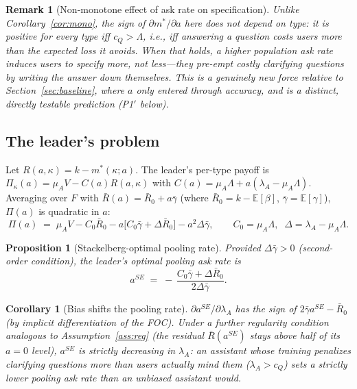 \documentclass[11pt]{article}
\newtheorem{proposition}{Proposition}
\newtheorem{corollary}{Corollary}
\newtheorem{remark}{Remark}
\begin{document}
\begin{remark}[Non-monotone effect of ask rate on specification]
Unlike Corollary~\ref{cor:mono}, the sign of $\partial m^*/\partial a$ here does
not depend on type: it is positive for \emph{every} type iff $c_Q > \Lambda$, i.e.,
iff answering a question costs users more than the expected loss it avoids. When
that holds, a higher population ask rate induces users to specify \emph{more}, not
less---they pre-empt costly clarifying questions by writing the answer down
themselves. This is a genuinely new force relative to Section~\ref{sec:baseline},
where $a$ only entered through accuracy, and is a distinct, directly testable
prediction (P1$'$ below).
\end{remark}

\subsection{The leader's problem}

Let $R(a,\kappa)=k-m^*(\kappa;a)$. The leader's per-type payoff is
$\Pi_\kappa(a) = \mu_A V - C(a)R(a,\kappa)$ with $C(a)=\mu_A\Lambda + a(\lambda_A -
\mu_A\Lambda)$. Averaging over $F$ with $\bar R(a) = \bar R_0 + a\bar\gamma$
(where $\bar R_0=k-\mathbb{E}[\beta]$, $\bar\gamma=\mathbb{E}[\gamma]$), $\Pi(a)$
is quadratic in $a$:
\[
\Pi(a) \;=\; \mu_A V - C_0\bar R_0 - a\big[C_0\bar\gamma + \Delta\bar R_0\big] -
a^2\Delta\bar\gamma, \qquad C_0=\mu_A\Lambda,\;\; \Delta=\lambda_A-\mu_A\Lambda.
\]

\begin{proposition}[Stackelberg-optimal pooling rate]\label{prop:aSE}
Provided $\Delta\bar\gamma>0$ (second-order condition), the leader's optimal
pooling ask rate is
\[
a^{SE} \;=\; -\,\frac{C_0\bar\gamma + \Delta \bar R_0}{2\Delta\bar\gamma}.
\]
\end{proposition}

\begin{corollary}[Bias shifts the pooling rate]
$\partial a^{SE}/\partial \lambda_A$ has the sign of $2\bar\gamma a^{SE} - \bar
R_0$ (by implicit differentiation of the FOC). Under a further regularity
condition analogous to Assumption~\ref{ass:reg} (the residual $\bar R(a^{SE})$
stays above half of its $a{=}0$ level), $a^{SE}$ is strictly decreasing in
$\lambda_A$: an assistant whose training penalizes clarifying questions more than
users actually mind them ($\lambda_A>c_Q$) sets a strictly lower pooling ask rate
than an unbiased assistant would.
\end{corollary}
\end{document}
